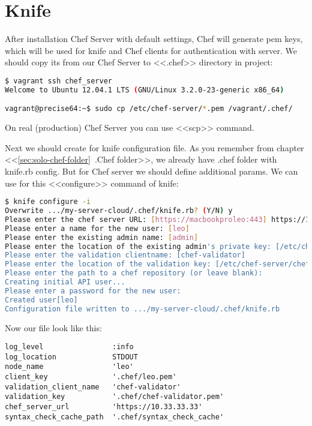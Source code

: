 \section{Knife}

After installation Chef Server with default settings, Chef will generate pem keys, which will be used for knife and Chef clients for authentication with server. We should copy its from our Chef Server to <<.chef>> directory in project:

\begin{lstlisting}[language=Bash,label=lst:my-server-cloud-knife1]
$ vagrant ssh chef_server
Welcome to Ubuntu 12.04.1 LTS (GNU/Linux 3.2.0-23-generic x86_64)

vagrant@precise64:~$ sudo cp /etc/chef-server/*.pem /vagrant/.chef/
\end{lstlisting}

On real (production) Chef Server you can use <<scp>> command.

Next we should create for knife configuration file. As you remember from chapter <<\ref{sec:solo-chef-folder}~.Chef folder>>, we already have .chef folder with knife.rb config. But for Chef server we should define additional params. We can use for this <<configure>> command of knife:

\begin{lstlisting}[language=Bash,label=lst:my-server-cloud-knife2]
$ knife configure -i
Overwrite .../my-server-cloud/.chef/knife.rb? (Y/N) y
Please enter the chef server URL: [https://macbookproleo:443] https://10.33.33.33
Please enter a name for the new user: [leo]
Please enter the existing admin name: [admin]
Please enter the location of the existing admin's private key: [/etc/chef-server/admin.pem] .chef/admin.pem
Please enter the validation clientname: [chef-validator]
Please enter the location of the validation key: [/etc/chef-server/chef-validator.pem] .chef/chef-validator.pem
Please enter the path to a chef repository (or leave blank):
Creating initial API user...
Please enter a password for the new user:
Created user[leo]
Configuration file written to .../my-server-cloud/.chef/knife.rb
\end{lstlisting}

Now our file look like this:

\begin{lstlisting}[label=lst:my-server-cloud-knife3,title=my-server-cloud/.chef/knife.rb]
log_level                :info
log_location             STDOUT
node_name                'leo'
client_key               '.chef/leo.pem'
validation_client_name   'chef-validator'
validation_key           '.chef/chef-validator.pem'
chef_server_url          'https://10.33.33.33'
syntax_check_cache_path  '.chef/syntax_check_cache'
\end{lstlisting}

